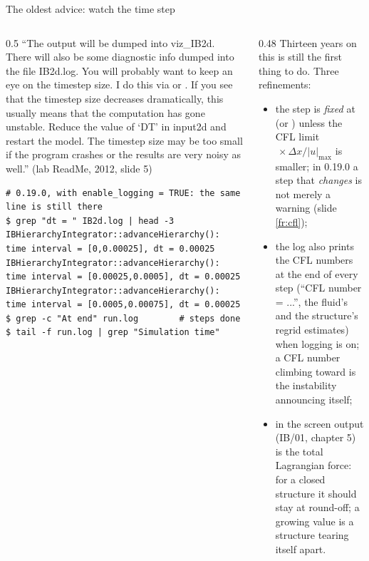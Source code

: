 \documentclass[aspectratio=169,11pt]{beamer}
\begin{document}
\begin{frame}[fragile]{The oldest advice: watch the time step}
\label{fr:dt}
\begin{columns}[T,onlytextwidth]
\begin{column}{0.5\textwidth}
\footnotesize ``The output will be dumped into viz\_IB2d. There will also be some diagnostic info dumped into the file IB2d.log. You will probably want to keep an eye on the timestep size. I do this via  or . If you see that the timestep size decreases dramatically, this usually means that the computation has gone unstable. Reduce the value of `DT' in input2d and restart the model. The timestep size may be too small if the program crashes or the results are very noisy as well.'' (lab ReadMe, 2012, slide 5)
\begin{lstlisting}[style=shelltiny]
# 0.19.0, with enable_logging = TRUE: the same line is still there
$ grep "dt = " IB2d.log | head -3
IBHierarchyIntegrator::advanceHierarchy(): time interval = [0,0.00025], dt = 0.00025
IBHierarchyIntegrator::advanceHierarchy(): time interval = [0.00025,0.0005], dt = 0.00025
IBHierarchyIntegrator::advanceHierarchy(): time interval = [0.0005,0.00075], dt = 0.00025
$ grep -c "At end" run.log        # steps done
$ tail -f run.log | grep "Simulation time"
\end{lstlisting}
\end{column}
\begin{column}{0.48\textwidth}
\footnotesize Thirteen years on this is still the first thing to do. Three refinements:
\begin{itemize}
  \item the step is \emph{fixed} at  (or ) unless the CFL limit $\,\times\Delta x/|u|_{\max}$ is smaller; in 0.19.0 a step that \emph{changes} is not merely a warning (slide \ref{fr:cfl});
  \item the log also prints the CFL numbers at the end of every step (``CFL number = ...'', the fluid's and the structure's regrid estimates) when logging is on; a CFL number climbing toward  is the instability announcing itself;
  \item {} in the screen output (IB/01, chapter 5) is the total Lagrangian force: for a closed structure it should stay at round-off; a growing value is a structure tearing itself apart.
\end{itemize}
\end{column}
\end{columns}
\end{frame}
\end{document}
